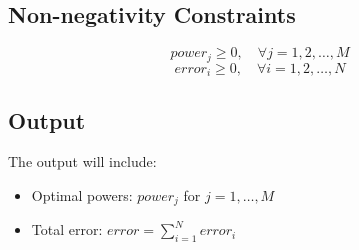 \documentclass{article}
\begin{document}
\subsection*{Non-negativity Constraints}
\[
power_j \geq 0, \quad \forall j = 1, 2, \ldots, M
\]
\[
error_i \geq 0, \quad \forall i = 1, 2, \ldots, N
\]

\subsection*{Output}
The output will include:
\begin{itemize}
    \item Optimal powers: $power_j$ for $j = 1, \ldots, M$
    \item Total error: $error = \sum_{i=1}^{N} error_i$
\end{itemize}
\end{document}
